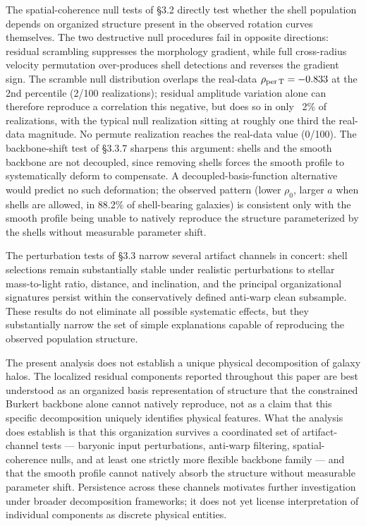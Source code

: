 \documentclass[linenumbers,trackchanges]{aastex701}
\begin{document}
The spatial-coherence null tests of \S3.2 directly test whether the shell population depends on organized structure present in the observed rotation curves themselves. The two destructive null procedures fail in opposite directions: residual scrambling suppresses the morphology gradient, while full cross-radius velocity permutation over-produces shell detections and reverses the gradient sign. The scramble null distribution overlaps the real-data $\rho_{\rm per\,T} = -0.833$ at the 2nd percentile (2/100 realizations); residual amplitude variation alone can therefore reproduce a correlation this negative, but does so in only ~2\% of realizations, with the typical null realization sitting at roughly one third the real-data magnitude. No permute realization reaches the real-data value (0/100). The backbone-shift test of \S3.3.7 sharpens this argument: shells and the smooth backbone are not decoupled, since removing shells forces the smooth profile to systematically deform to compensate. A decoupled-basis-function alternative would predict no such deformation; the observed pattern (lower $\rho_0$, larger $a$ when shells are allowed, in 88.2\% of shell-bearing galaxies) is consistent only with the smooth profile being unable to natively reproduce the structure parameterized by the shells without measurable parameter shift.

The perturbation tests of \S3.3 narrow several artifact channels in concert: shell selections remain substantially stable under realistic perturbations to stellar mass-to-light ratio, distance, and inclination, and the principal organizational signatures persist within the conservatively defined anti-warp clean subsample. These results do not eliminate all possible systematic effects, but they substantially narrow the set of simple explanations capable of reproducing the observed population structure.

The present analysis does not establish a unique physical decomposition of galaxy halos. The localized residual components reported throughout this paper are best understood as an organized basis representation of structure that the constrained Burkert backbone alone cannot natively reproduce, not as a claim that this specific decomposition uniquely identifies physical features. What the analysis does establish is that this organization survives a coordinated set of artifact-channel tests --- baryonic input perturbations, anti-warp filtering, spatial-coherence nulls, and at least one strictly more flexible backbone family --- and that the smooth profile cannot natively absorb the structure without measurable parameter shift. Persistence across these channels motivates further investigation under broader decomposition frameworks; it does not yet license interpretation of individual components as discrete physical entities.
\end{document}
